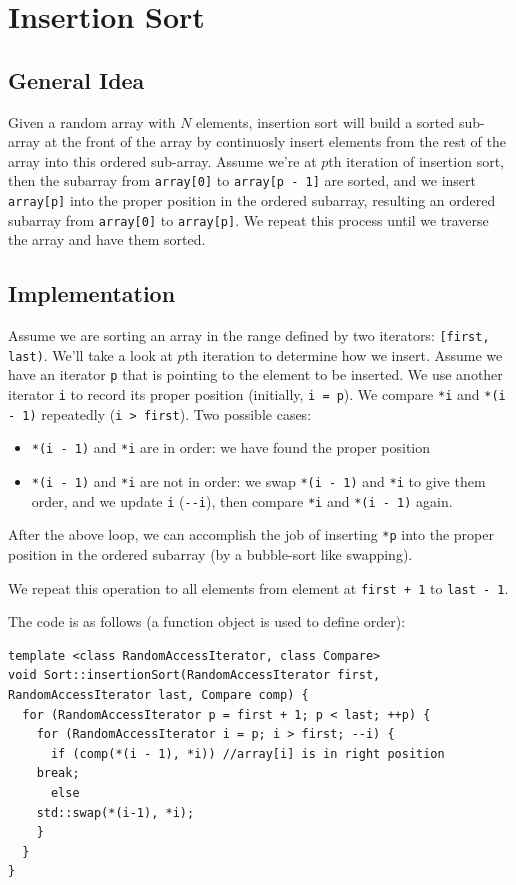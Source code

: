 \documentclass[11pt]{book}
\begin{document}
\chapter{Insertion Sort}
\label{sec:org979e9d9}
\section{General Idea}
\label{sec:orgd8b66fd}
Given a random array with \(N\) elements, insertion sort will build a sorted sub-array at the front of the array by continuosly insert elements from the rest of the array into this ordered sub-array. Assume we're at \(p\)th iteration of insertion sort, then the subarray from \texttt{array[0]} to \texttt{array[p - 1]} are sorted, and we insert \texttt{array[p]} into the proper position in the ordered subarray, resulting an ordered subarray from \texttt{array[0]} to \texttt{array[p]}. We repeat this process until we traverse the array and have them sorted.
\section{Implementation}
\label{sec:orgf6c5b77}
Assume we are sorting an array in the range defined by two iterators: \texttt{[first, last)}. We'll take a look at \(p\)th iteration to determine how we insert. Assume we have an iterator \texttt{p} that is pointing to the element to be inserted. We use another iterator \texttt{i} to record its proper position (initially, \texttt{i = p}). We compare \texttt{*i} and \texttt{*(i - 1)} repeatedly (\texttt{i > first}). Two possible cases:
\begin{itemize}
\item \texttt{*(i - 1)} and \texttt{*i} are in order: we have found the proper position
\item \texttt{*(i - 1)} and \texttt{*i} are not in order: we swap \texttt{*(i - 1)} and \texttt{*i} to give them order, and we update \texttt{i} (\texttt{-{}-i}), then compare \texttt{*i} and \texttt{*(i - 1)} again.
\end{itemize}

After the above loop, we can accomplish the job of inserting \texttt{*p} into the proper position in the ordered subarray (by a bubble-sort like swapping).

We repeat this operation to all elements from element at \texttt{first + 1} to \texttt{last - 1}.

The code is as follows (a function object is used to define order):
\begin{verbatim}
template <class RandomAccessIterator, class Compare>
void Sort::insertionSort(RandomAccessIterator first, RandomAccessIterator last, Compare comp) {
  for (RandomAccessIterator p = first + 1; p < last; ++p) {
    for (RandomAccessIterator i = p; i > first; --i) {
      if (comp(*(i - 1), *i)) //array[i] is in right position
	break;
      else 
	std::swap(*(i-1), *i);
    }
  }  
}
\end{verbatim}
\end{document}
